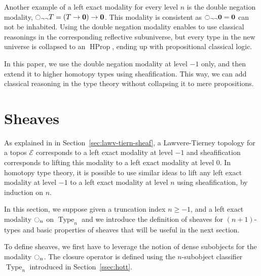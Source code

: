 \documentclass[preprint,9pt,numbers]{sigplanconf}
\DeclareMathOperator{\Type}{Type}
\DeclareMathOperator{\HProp}{HProp}
\newcommand{\modal}{\ensuremath{\ocircle}}
\newcommand \E {\mathcal{E}}
\newcommand \zero {\mathbf{0}}
\begin{document}
Another example of a left exact modality for every level $n$ is the
double negation modality,
$\modal_{\lnot\lnot} T = (T \to \zero) \to \zero$.
%
This modality is consistent as $\modal_{\lnot\lnot} \zero = \zero$ can
not be inhabited.
%
Using the double negation modality enables to use classical reasonings
in the corresponding reflective subuniverse, but every type in the new
universe is collapsed to an $\HProp$, ending up with propositional
classical logic.

In this paper, we use the double negation modality at level $-1$ only,
and then extend it to higher homotopy types using sheafification. This
way, we can add classical reasoning in the type theory without
collapsing it to mere propositions.




\section{Sheaves}
\label{sec:sheaves}

As explained in in Section~\ref{sec:lawv-tiern-sheaf}, a
Lawvere-Tierney topology for a topos $\E$ corresponds to a left exact
modality at level $-1$
%
and sheafification corresponds to lifting this modality to a left
exact modality at level $0$.
%
In homotopy type theory, it is possible to use similar ideas to lift
any left exact modality at level $-1$ to a left exact modality at level
$n$ using sheafification, by induction on $n$.

In this section, we suppose given a truncation index $n\geqslant -1$,
and a left exact modality $\modal_n$ on $\Type_n$ and we introduce the
definition of sheaves for $(n+1)$-types and basic properties of
sheaves that will be useful in the next section. 



To define sheaves, we first have to leverage the notion of dense
subobjects for the modality $\modal_n$. The closure operator is defined
using the $n$-subobject classifier $\Type_n$ introduced in
Section~\ref{ssec:hott}.
\end{document}
